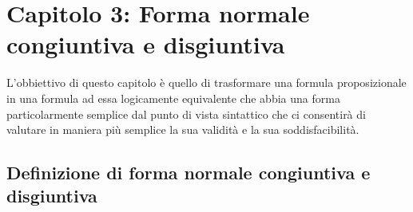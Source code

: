 \section{Capitolo  3: Forma normale congiuntiva e disgiuntiva}
\begin{flushleft}
L'obbiettivo di questo capitolo è quello di trasformare una formula proposizionale
in una formula ad essa logicamente equivalente che abbia una forma particolarmente
semplice dal punto di vista sintattico che ci consentirà di valutare in maniera più
semplice la sua validità e la sua soddisfacibilità.
\end{flushleft}

\subsection{Definizione di forma normale congiuntiva e disgiuntiva}


